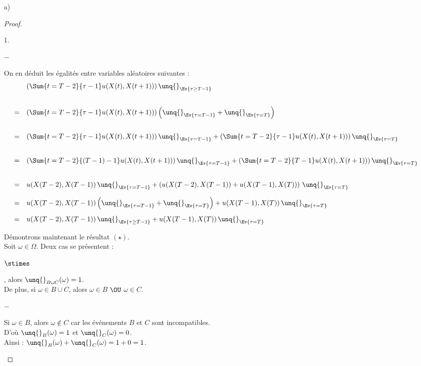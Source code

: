 \begin{noliste}{a)}
\begin{proof}
\begin{remarkL}{1.}
\begin{noliste}{$-$}
	  \item On en déduit les égalités entre variables aléatoires
	  suivantes :
	  \[
	    \begin{array}{cl}
	      & \left(\Sum{t=T-2}{\tau -1} u(X(t),X(t+1))\right)
	      \unq{}_{\Ev{\tau \geq T-1}}
	      \\[.8cm]
	      =& 
	      \left(\Sum{t=T-2}{\tau -1} u(X(t),X(t+1))\right)
	      \left(\unq{}_{\Ev{\tau = T-1}} + \unq{}_{\Ev{\tau =T}}
	      \right)
	      \\[.8cm]
	      =& 
	      \left(\Sum{t=T-2}{\tau -1} u(X(t),X(t+1))\right)
	      \unq{}_{\Ev{\tau = T-1}} +
	      \left(\Sum{t=T-2}{\tau -1} u(X(t),X(t+1))\right)
	      \unq{}_{\Ev{\tau = T}}
	      \\[.8cm]
	      =& 
	      \left(\Sum{t=T-2}{(T-1) -1} u(X(t),X(t+1))\right)
	      \unq{}_{\Ev{\tau = T-1}} +
	      \left(\Sum{t=T-2}{T -1} u(X(t),X(t+1))\right)
	      \unq{}_{\Ev{\tau = T}}
	      \\[.8cm]
	      =&
	      u(X(T-2),X(T-1)) \, \unq{}_{\Ev{\tau =T-1}} + 
	      \left(u(X(T-2),X(T-1)) + u(X(T-1),X(T))\right)
	      \, \unq{}_{\Ev{\tau =T}}
	      \\[.4cm]
	      =&
	      u(X(T-2),X(T-1)) \left( \unq{}_{\Ev{\tau =T-1}} + 
	      \unq{}_{\Ev{\tau =T}}\right)
	      + u(X(T-1),X(T)) \, \unq{}_{\Ev{\tau=T}}
	      \\[.4cm]
	      =&
	      u(X(T-2),X(T-1)) \, \unq{}_{\Ev{\tau \geq T-1}} + 
	      u(X(T-1),X(T)) \, \unq{}_{\Ev{\tau =T}}
	    \end{array}
	  \]
        \end{noliste}
        \end{remarkL}
        
        
        \newpage
        
        
        \begin{remark}
        Démontrons maintenant le résultat $(\star)$.\\
        Soit $\omega \in \Omega$. Deux cas se présentent :
        \begin{noliste}{$\stimes$}
	  \item {}, alors 
	  $\unq{}_{B \cup C}(\omega)=1$.\\[.1cm]
	  De plus, si $\omega \in B \cup C$, alors $\omega \in B$ $\OU$
	  $\omega \in C$.
	  \begin{liste}{$-$}
	    \item Si $\omega \in B$, alors $\omega \notin C$ car les
	    événements $B$ et $C$ sont incompatibles.\\
	    D'où $\unq{}_B(\omega)=1$ et $\unq{}_C(\omega)=0$.\\
	    Ainsi : $\unq{}_B(\omega) + \unq{}_C(\omega) = 1+0=1$.
	    

\end{liste}
\end{noliste}
\end{remark}
\end{proof}
\end{noliste}
